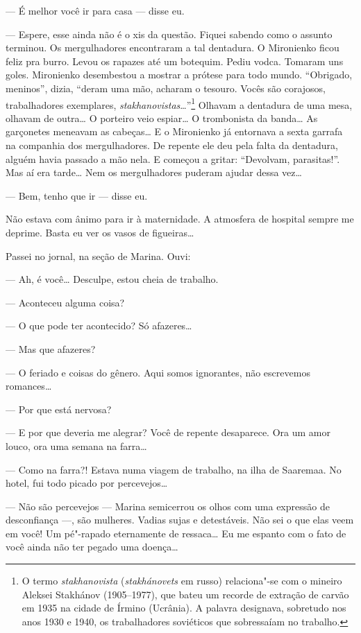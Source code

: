 --- É melhor você ir para casa --- disse eu.

--- Espere, esse ainda não é o xis da questão. Fiquei sabendo como o
assunto terminou. Os mergulhadores encontraram a tal dentadura. O
Mironienko ficou feliz pra burro. Levou os rapazes até um botequim.
Pediu vodca. Tomaram uns goles. Mironienko desembestou a mostrar a
prótese para todo mundo. ``Obrigado, meninos'', dizia, ``deram uma mão,
acharam o tesouro. Vocês são corajosos, trabalhadores exemplares,
\emph{stakhanovistas}\ldots{}''\footnote{O termo \emph{stakhanovista}
  (\emph{stakhánovets} em russo) relaciona"-se com o mineiro Aleksei
  Stakhánov (1905--1977), que bateu um recorde de extração de
  carvão em 1935 na cidade de Írmino (Ucrânia). A palavra designava,
  sobretudo nos anos 1930 e 1940, os trabalhadores soviéticos que
  sobressaíam no trabalho.} Olhavam a dentadura de uma mesa, olhavam de
outra\ldots{} O porteiro veio espiar\ldots{} O trombonista da banda\ldots{} As
garçonetes meneavam as cabeças\ldots{} E o Mironienko já entornava a sexta
garrafa na companhia dos mergulhadores. De repente ele deu pela falta da
dentadura, alguém havia passado a mão nela. E começou a gritar:
``Devolvam, parasitas!''. Mas aí era tarde\ldots{} Nem os mergulhadores
puderam ajudar dessa vez\ldots{}

--- Bem, tenho que ir --- disse eu.

Não estava com ânimo para ir à maternidade. A atmosfera de hospital
sempre me deprime. Basta eu ver os vasos de figueiras\ldots{}

Passei no jornal, na seção de Marina. Ouvi:

--- Ah, é você\ldots{} Desculpe, estou cheia de trabalho.

--- Aconteceu alguma coisa?

--- O que pode ter acontecido? Só afazeres\ldots{}

--- Mas que afazeres?

--- O feriado e coisas do gênero. Aqui somos ignorantes, não escrevemos
romances\ldots{}

--- Por que está nervosa?

--- E por que deveria me alegrar? Você de repente desaparece. Ora um
amor louco, ora uma semana na farra\ldots{}

--- Como na farra?! Estava numa viagem de trabalho, na ilha de Saaremaa.
No hotel, fui todo picado por percevejos\ldots{}

--- Não são percevejos --- Marina semicerrou os olhos com uma expressão
de desconfiança ---, são mulheres. Vadias sujas e detestáveis. Não sei o
que elas veem em você! Um pé"-rapado eternamente de ressaca\ldots{} Eu me
espanto com o fato de você ainda não ter pegado uma doença\ldots{}

